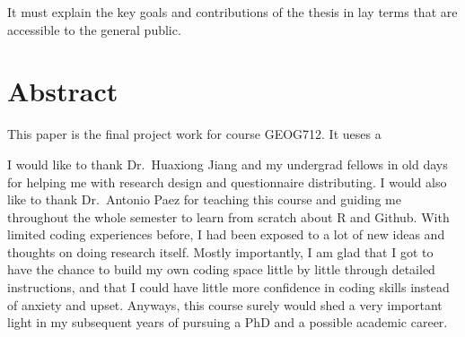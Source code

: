 \documentclass[
11pt, %
oneside, %
english, %
singlespacing, %
]{macthesis} %
\def\blankpage{%
      \clearpage%
      \thispagestyle{empty}%
      \addtocounter{page}{-1}%
      \null%
      \clearpage}
\begin{document}
  It must explain the key goals and contributions of the thesis in lay terms that are accessible to the general public.
\blankpage
\clearpage



\section*{\Huge Abstract}
\addchaptertocentry{\abstractname}
This paper is the final project work for course GEOG712. It ueses a
\blankpage
\clearpage


  \begin{acknowledgements}
  \addchaptertocentry{\acknowledgementname} %
    I would like to thank Dr.~Huaxiong Jiang and my undergrad fellows in old days for helping me with research design and questionnaire distributing. I would also like to thank Dr.~Antonio Paez for teaching this course and guiding me throughout the whole semester to learn from scratch about R and Github. With limited coding experiences before, I had been exposed to a lot of new ideas and thoughts on doing research itself. Mostly importantly, I am glad that I got to have the chance to build my own coding space little by little through detailed instructions, and that I could have little more confidence in coding skills instead of anxiety and upset. Anyways, this course surely would shed a very important light in my subsequent years of pursuing a PhD and a possible academic career.
  \end{acknowledgements}
\blankpage
\clearpage


\tableofcontents %

\listoffigures %

\listoftables %
\end{document}
